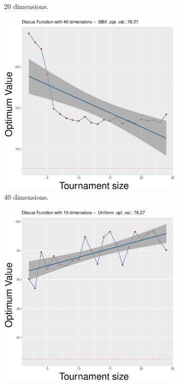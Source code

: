 \begin{figure}[t]
\begin{subfigure}[b]{0.33\textwidth}
		\caption{20 dimensions.}
	\end{subfigure}
	\begin{subfigure}[b]{0.33\textwidth}
		\centering
		\includegraphics[width=\textwidth]{img/SBX-40D/unimodal_sbx_11_dim_40.pdf}
		\caption{40 dimensions.}
	\end{subfigure}
	\caption{Average performance on different tournament size for the Discus Function, when using the SBX crossover - ($\lambda, \lambda$) scheme.}
	\label{sbx-11-a}
	\begin{subfigure}[b]{0.33\textwidth}
		\centering
		\includegraphics[width=\textwidth]{img/uniform-10D/unimodal_uniform_11_dim_10.pdf}

\end{subfigure}
\end{figure}
